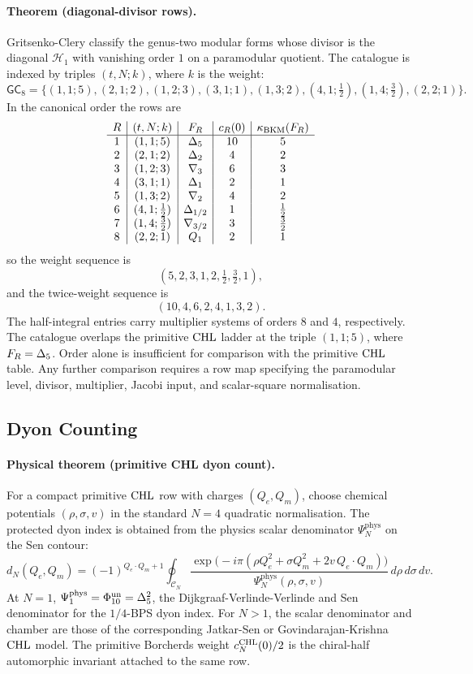 \paragraph{Theorem (diagonal-divisor rows).}
Gritsenko-Clery classify the genus-two modular forms whose divisor is
the diagonal \(\mathcal H_1\) with vanishing order \(1\) on a
paramodular quotient.  The catalogue is indexed by triples \((t,N;k)\),
where \(k\) is the weight:
\[
 \mathsf{GC}_8=
 \{(1,1;5),(2,1;2),(1,2;3),(3,1;1),(1,3;2),
 (4,1;\tfrac12),(1,4;\tfrac32),(2,2;1)\}.
\]
In the canonical order the rows are
\[
\begin{array}{c|c|c|c|c}
R&(t,N;k)&F_R&c_R(0)&\kappa_{\mathrm{BKM}}(F_R)\\ \hline
1&(1,1;5)&\Delta_5&10&5\\
2&(2,1;2)&\Delta_2&4&2\\
3&(1,2;3)&\nabla_3&6&3\\
4&(3,1;1)&\Delta_1&2&1\\
5&(1,3;2)&\nabla_2&4&2\\
6&(4,1;\tfrac12)&\Delta_{1/2}&1&\tfrac12\\
7&(1,4;\tfrac32)&\nabla_{3/2}&3&\tfrac32\\
8&(2,2;1)&Q_1&2&1
\end{array}
\]
so the weight sequence is
\[
  (5,2,3,1,2,\tfrac12,\tfrac32,1),
\]
and the twice-weight sequence is
\[
  (10,4,6,2,4,1,3,2).
\]
The half-integral entries carry multiplier systems of orders \(8\) and
\(4\), respectively.  The catalogue overlaps the primitive \(\mathrm{CHL}\)
ladder at the triple \((1,1;5)\), where \(F_R=\Delta_5\).  Order alone
is insufficient for comparison with the primitive \(\mathrm{CHL}\) table.  Any
further comparison requires a row map specifying the paramodular level,
divisor, multiplier, Jacobi input, and scalar-square normalisation.

\subsection*{Dyon Counting}

\paragraph{Physical theorem (primitive CHL dyon count).}
For a compact primitive \(\mathrm{CHL}\) row with charges \((Q_e,Q_m)\), choose
chemical potentials \((\rho,\sigma,v)\) in the standard \(N=4\) quadratic
normalisation.  The protected dyon index is obtained from the physics
scalar denominator \(\Psi_N^{\mathrm{phys}}\) on the Sen contour:
\[
  d_N(Q_e,Q_m)=(-1)^{Q_e\cdot Q_m+1}
  \oint_{\mathcal C_N}
  \frac{\exp\!\bigl(-i\pi(\rho Q_e^2+\sigma Q_m^2+
  2v\,Q_e\cdot Q_m)\bigr)}
  {\Psi_N^{\mathrm{phys}}(\rho,\sigma,v)}
  \,d\rho\,d\sigma\,dv .
\]
At \(N=1\), \(\Psi_1^{\mathrm{phys}}=\Phi_{10}^{\mathrm{un}}=\Delta_5^2\), the
Dijkgraaf-Verlinde-Verlinde and Sen denominator for the \(1/4\)-BPS
dyon index.  For \(N>1\), the scalar denominator and chamber are those
of the corresponding Jatkar-Sen or Govindarajan-Krishna \(\mathrm{CHL}\)
model.  The primitive Borcherds weight \(c_N^{\mathrm{CHL}}(0)/2\) is the
chiral-half automorphic invariant attached to the same row.

